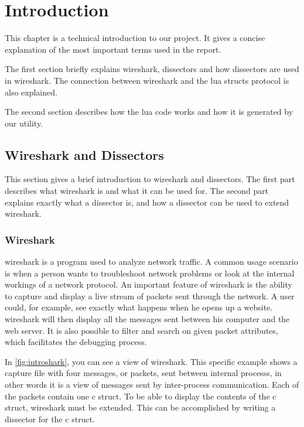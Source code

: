 \chapter{Introduction}

This chapter is a technical introduction to our project.
It gives a concise explanation of the most important terms used in the report.

The first section briefly explains \Gls{wireshark}, \glspl{dissector} and how \glspl{dissector} are used in \Gls{wireshark}.
The connection between \Gls{wireshark} and the \Gls{lua} \glspl{struct} \gls{protocol} is also explained.

The second section describes how the \Gls{lua} code works and how it is generated by our \gls{utility}.

\section{Wireshark and Dissectors}
This section gives a brief introduction to \Gls{wireshark} and \glspl{dissector}.
The first part describes what \Gls{wireshark} is and what it can be used for.
The second part explains exactly what a \gls{dissector} is, and how a \gls{dissector} can be used to extend \Gls{wireshark}.

\subsection{Wireshark}
\Gls{wireshark} is a program used to analyze network traffic. A common usage scenario is when a person wants to troubleshoot network problems or
look at the internal workings of a network \gls{protocol}. An important feature of \Gls{wireshark} is the ability to capture and display a live stream of \glspl{packet} sent through the network. 
A user could, for example, see exactly what happens when he opens up a website. \Gls{wireshark} will then display all the messages
sent between his computer and the web server. It is also possible to filter and search on given \gls{packet} attributes, which facilitates the debugging \gls{process}.

In \autoref{fig:introshark}, you can see a view of \Gls{wireshark}.
This specific example shows a capture file with four messages, or \glspl{packet}, sent between internal \glspl{process}, in other words
it is a view of messages sent by inter-\gls{process} communication. Each of the \glspl{packet} contain one \Gls{c} \gls{struct}.
To be able to display the contents of the \Gls{c} \gls{struct}, \Gls{wireshark} must be extended. 
This can be accomplished by writing a \gls{dissector} for the \Gls{c} \gls{struct}.

